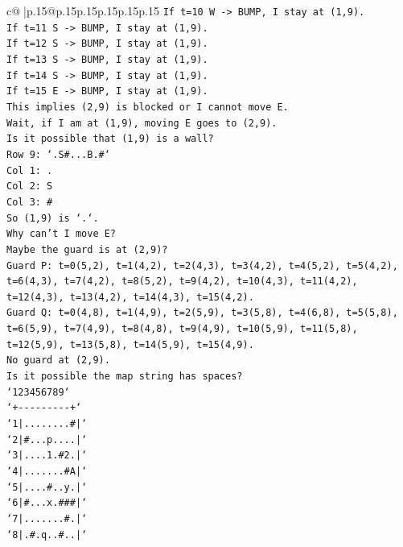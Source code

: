 \documentclass{article}
\begin{document}
{\begin{supertabular}{c@{$\;$}|p{.15\linewidth}@{}p{.15\linewidth}p{.15\linewidth}p{.15\linewidth}p{.15\linewidth}p{.15\linewidth}}
{{{\texttt{If t=10 W {-}> BUMP, I stay at (1,9).} \\
\texttt{If t=11 S {-}> BUMP, I stay at (1,9).} \\
\texttt{If t=12 S {-}> BUMP, I stay at (1,9).} \\
\texttt{If t=13 S {-}> BUMP, I stay at (1,9).} \\
\texttt{If t=14 S {-}> BUMP, I stay at (1,9).} \\
\texttt{If t=15 E {-}> BUMP, I stay at (1,9).} \\
\texttt{This implies (2,9) is blocked or I cannot move E.} \\
\texttt{Wait, if I am at (1,9), moving E goes to (2,9).} \\
\texttt{Is it possible that (1,9) is a wall?} \\
\texttt{Row 9: `.S\#...B.\#`} \\
\texttt{Col 1: .} \\
\texttt{Col 2: S} \\
\texttt{Col 3: \#} \\
\texttt{So (1,9) is `.`.} \\
\texttt{Why can't I move E?} \\
\texttt{Maybe the guard is at (2,9)?} \\
\texttt{Guard P: t=0(5,2), t=1(4,2), t=2(4,3), t=3(4,2), t=4(5,2), t=5(4,2), t=6(4,3), t=7(4,2), t=8(5,2), t=9(4,2), t=10(4,3), t=11(4,2), t=12(4,3), t=13(4,2), t=14(4,3), t=15(4,2).} \\
\texttt{Guard Q: t=0(4,8), t=1(4,9), t=2(5,9), t=3(5,8), t=4(6,8), t=5(5,8), t=6(5,9), t=7(4,9), t=8(4,8), t=9(4,9), t=10(5,9), t=11(5,8), t=12(5,9), t=13(5,8), t=14(5,9), t=15(4,9).} \\
\texttt{No guard at (2,9).} \\
\texttt{Is it possible the map string has spaces?} \\
\texttt{`123456789`} \\
\texttt{`+{-}{-}{-}{-}{-}{-}{-}{-}{-}+`} \\
\texttt{`1|........\#|`} \\
\texttt{`2|\#...p....|`} \\
\texttt{`3|....1.\#2.|`} \\
\texttt{`4|.......\#A|`} \\
\texttt{`5|....\#..y.|`} \\
\texttt{`6|\#...x.\#\#\#|`} \\
\texttt{`7|.......\#.|`} \\
\texttt{`8|.\#.q..\#..|`} \\
}}}
\end{supertabular}}
\end{document}
